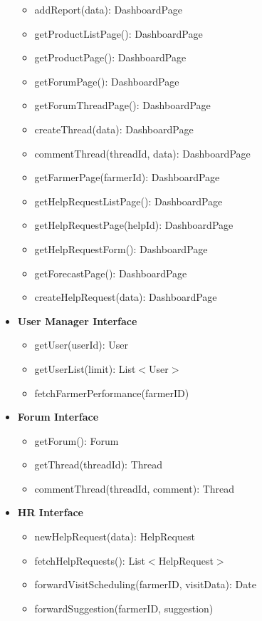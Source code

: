 \documentclass[10pt]{article} %
\begin{document}
\begin{itemize}
\begin{itemize}
        \item addReport(data): DashboardPage
        \item getProductListPage(): DashboardPage
        \item getProductPage(): DashboardPage
        \item getForumPage(): DashboardPage
        \item getForumThreadPage(): DashboardPage
        \item createThread(data): DashboardPage
        \item commentThread(threadId, data): DashboardPage 
        \item getFarmerPage(farmerId): DashboardPage
        \item getHelpRequestListPage(): DashboardPage
        \item getHelpRequestPage(helpId): DashboardPage
        \item getHelpRequestForm(): DashboardPage
        \item getForecastPage(): DashboardPage
        \item createHelpRequest(data): DashboardPage
    \end{itemize}
    \item \textbf{User Manager Interface}
    \begin{itemize}
        \item getUser(userId): User
        \item getUserList(limit): List$<$User$>$ 
        \item fetchFarmerPerformance(farmerID)
    \end{itemize}
    \item \textbf{Forum Interface}
    \begin{itemize}
        \item getForum(): Forum
        \item getThread(threadId): Thread 
        \item commentThread(threadId, comment): Thread
    \end{itemize}
    \item \textbf{HR Interface}
    \begin{itemize}
        \item newHelpRequest(data): HelpRequest
        \item fetchHelpRequests(): List$<$HelpRequest$>$
        \item forwardVisitScheduling(farmerID, visitData): Date
        \item forwardSuggestion(farmerID, suggestion)

\end{itemize}
\end{itemize}
\end{document}
